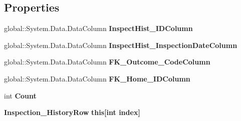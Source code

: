 \subsection*{Properties}
\begin{DoxyCompactItemize}
\item 
\mbox{\label{class_a_f_h___scheduler_1_1_home_inspection_db_data_set_1_1_inspection___history_data_table_a7447171dab892d75076afc33b867ee03}} 
global\+::\+System.\+Data.\+Data\+Column {\bfseries Inspect\+Hist\+\_\+\+I\+D\+Column}\hspace{0.3cm}{\ttfamily  [get]}
\item 
\mbox{\label{class_a_f_h___scheduler_1_1_home_inspection_db_data_set_1_1_inspection___history_data_table_a0e73b76f9ba2832d30fe258fa8d6254d}} 
global\+::\+System.\+Data.\+Data\+Column {\bfseries Inspect\+Hist\+\_\+\+Inspection\+Date\+Column}\hspace{0.3cm}{\ttfamily  [get]}
\item 
\mbox{\label{class_a_f_h___scheduler_1_1_home_inspection_db_data_set_1_1_inspection___history_data_table_a5ab64d4df6bb5f98d04c6933e82de843}} 
global\+::\+System.\+Data.\+Data\+Column {\bfseries F\+K\+\_\+\+Outcome\+\_\+\+Code\+Column}\hspace{0.3cm}{\ttfamily  [get]}
\item 
\mbox{\label{class_a_f_h___scheduler_1_1_home_inspection_db_data_set_1_1_inspection___history_data_table_a857ecdd7d78836bf3eb11413a2cdf099}} 
global\+::\+System.\+Data.\+Data\+Column {\bfseries F\+K\+\_\+\+Home\+\_\+\+I\+D\+Column}\hspace{0.3cm}{\ttfamily  [get]}
\item 
\mbox{\label{class_a_f_h___scheduler_1_1_home_inspection_db_data_set_1_1_inspection___history_data_table_a19b68571bde57f9a16f3d813ef243bc4}} 
int {\bfseries Count}\hspace{0.3cm}{\ttfamily  [get]}
\item 
\mbox{\label{class_a_f_h___scheduler_1_1_home_inspection_db_data_set_1_1_inspection___history_data_table_a373767920b809c388b60e802a9a482dc}} 
\textbf{ Inspection\+\_\+\+History\+Row} {\bfseries this[int index]}\hspace{0.3cm}{\ttfamily  [get]}
\end{DoxyCompactItemize}
